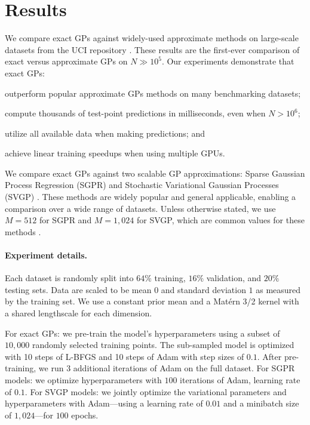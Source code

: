 \section{Results}
\label{sec:largeexact_results}

We compare exact GPs against widely-used approximate methods on large-scale datasets from the UCI repository \cite{asuncion2007uci}.
These results are the first-ever comparison of exact versus approximate GPs on $N\gg 10^5$.
Our experiments demonstrate that exact GPs:
\begin{enumerate*}
  \item outperform popular approximate GPs methods on many benchmarking datasets;
  \item compute thousands of test-point predictions in milliseconds, even when $N > 10^6$;
  \item utilize all available data when making predictions; and
  \item achieve linear training speedups when using multiple GPUs.
\end{enumerate*}

We compare exact GPs against two scalable GP approximations: Sparse Gaussian Process Regression (SGPR) \cite{titsias2009variational} and Stochastic Variational Gaussian Processes (SVGP) \cite{hensman2013gaussian}.
These methods are widely popular and general applicable, enabling a comparison over a wide range of datasets.
Unless otherwise stated, we use $M = 512$ for SGPR and $M = 1,\!024$ for SVGP, which are common values for these methods \cite{matthews2017gpflow}.

\paragraph{Experiment details.}
Each dataset is randomly split into $64\%$ training, $16\%$ validation, and $20\%$ testing sets.
Data are scaled to be mean $0$ and standard deviation $1$ as measured by the training set.
We use a constant prior mean and a Mat\'ern 3/2 kernel with a shared lengthscale for each dimension.

For exact GPs: we pre-train the model's hyperparameters using a subset of $10,\!000$ randomly selected training points.
The sub-sampled model is optimized with 10 steps of L-BFGS \citep{liu1989lbfgs} and 10 steps of Adam \citep{kingma2014adam} with step sizes of $0.1$.
After pre-training, we run 3 additional iterations of Adam on the full dataset.
For SGPR models: we optimize hyperparameters with $100$ iterations of Adam, learning rate of $0.1$.
For SVGP models: we jointly optimize the variational parameters and hyperparameters with Adam---using a learning rate of $0.01$ and a minibatch size of $1,\!024$---for $100$ epochs.


